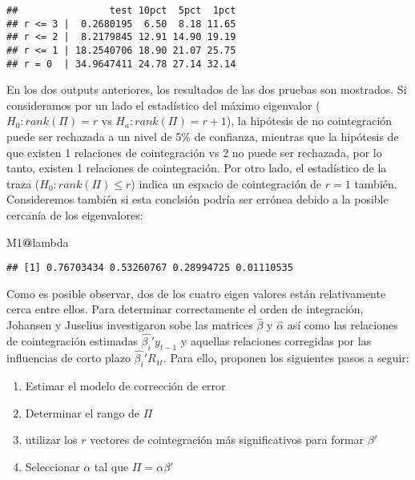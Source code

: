 \documentclass[]{book}
\newenvironment{Shaded}{\begin{snugshade}}{\end{snugshade}}
\newcommand{\OperatorTok}[1]{\textcolor[rgb]{0.81,0.36,0.00}{\textbf{#1}}}
\newcommand{\NormalTok}[1]{#1}
\providecommand{\tightlist}{%
  \setlength{\itemsep}{0pt}\setlength{\parskip}{0pt}}
\theoremstyle{definition}
\theoremstyle{definition}
\theoremstyle{definition}
\theoremstyle{remark}
\begin{document}
\begin{verbatim}
##                test 10pct  5pct  1pct
## r <= 3 |  0.2680195  6.50  8.18 11.65
## r <= 2 |  8.2179845 12.91 14.90 19.19
## r <= 1 | 18.2540706 18.90 21.07 25.75
## r = 0  | 34.9647411 24.78 27.14 32.14
\end{verbatim}

En los dos outputs anteriores, los resultados de las dos pruebas son
mostrados. Si consideramos por un lado el estadístico del máximo
eigenvalor (\(H_0:rank(\Pi)=r\) vs \(H_a:rank(\Pi)=r+1\)), la hipótesis
de no cointegración puede ser rechazada a un nivel de 5\% de confianza,
mientras que la hipótesis de que existen 1 relaciones de cointegración
vs 2 no puede ser rechazada, por lo tanto, existen 1 relaciones de
cointegración. Por otro lado, el estadístico de la traza
(\(H_0: rank(\Pi)\leq r\)) indica un espacio de cointegración de \(r=1\)
también. Consideremos también si esta conclsión podría ser errónea
debido a la posible cercanía de los eigenvalores:

\begin{Shaded}
\begin{Highlighting}[]
\NormalTok{M1}\OperatorTok{@}\NormalTok{lambda}
\end{Highlighting}
\end{Shaded}

\begin{verbatim}
## [1] 0.76703434 0.53260767 0.28994725 0.01110535
\end{verbatim}

Como es posible observar, dos de los cuatro eigen valores están
relativamente cerca entre ellos. Para determinar correctamente el orden
de integración, Johansen y Juselius investigaron sobe las matrices
\(\hat{\beta}\) y \(\hat{\alpha}\) así como las relaciones de
cointegración estimadas \(\hat{\beta_i}'y_{t-1}\) y aquellas relaciones
corregidas por las influencias de corto plazo \(\hat{\beta_i}'R_{1t}\).
Para ello, proponen los siguientes pasos a seguir:

\begin{enumerate}
\def\labelenumi{\arabic{enumi})}
\tightlist
\item
  Estimar el modelo de corrección de error
\item
  Determinar el rango de \(\Pi\)
\item
  utilizar los \(r\) vectores de cointegración más significativos para
  formar \(\beta'\)
\item
  Seleccionar \(\alpha\) tal que \(\Pi=\alpha\beta'\)
\end{enumerate}
\end{document}
